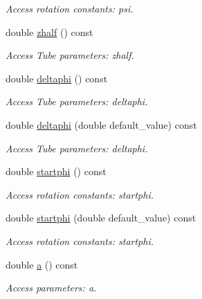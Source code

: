 \begin{DoxyCompactItemize}
\begin{DoxyCompactList}\small\item\em Access rotation constants: psi. \item\end{DoxyCompactList}\item 
double \hyperlink{struct_d_d4hep_1_1_x_m_l_1_1_dimension_af3d04e829a1235b14a281f4784d672b6}{zhalf} () const 
\begin{DoxyCompactList}\small\item\em Access Tube parameters: zhalf. \item\end{DoxyCompactList}\item 
double \hyperlink{struct_d_d4hep_1_1_x_m_l_1_1_dimension_a1fa642edcace2c3994e29bd965c893bc}{deltaphi} () const 
\begin{DoxyCompactList}\small\item\em Access Tube parameters: deltaphi. \item\end{DoxyCompactList}\item 
double \hyperlink{struct_d_d4hep_1_1_x_m_l_1_1_dimension_a1c022c3cee7cedefaf27a7bf162c58fe}{deltaphi} (double default\_\-value) const 
\begin{DoxyCompactList}\small\item\em Access Tube parameters: deltaphi. \item\end{DoxyCompactList}\item 
double \hyperlink{struct_d_d4hep_1_1_x_m_l_1_1_dimension_a0def6c6a10feb3448baea92a3dc3504d}{startphi} () const 
\begin{DoxyCompactList}\small\item\em Access rotation constants: startphi. \item\end{DoxyCompactList}\item 
double \hyperlink{struct_d_d4hep_1_1_x_m_l_1_1_dimension_ab67ae37dfa868013a7237414f2cb8b76}{startphi} (double default\_\-value) const 
\begin{DoxyCompactList}\small\item\em Access rotation constants: startphi. \item\end{DoxyCompactList}\item 
double \hyperlink{struct_d_d4hep_1_1_x_m_l_1_1_dimension_a28e671ab611d1eb8f19bc9476938be8f}{a} () const 
\begin{DoxyCompactList}\small\item\em Access parameters: a. \item\end{DoxyCompactList}\item 

\end{DoxyCompactItemize}
